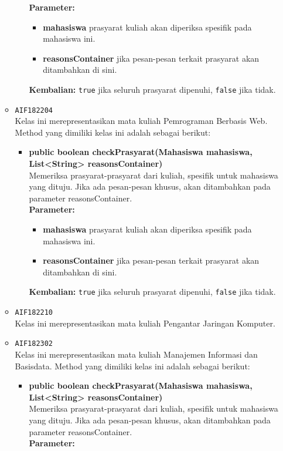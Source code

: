 \begin{enumerate}
\begin{itemize}
\begin{itemize}
\textbf{Parameter:}
\begin{itemize}
\item \textbf{mahasiswa} prasyarat kuliah akan diperiksa spesifik pada mahasiswa ini.
\item \textbf{reasonsContainer} jika pesan-pesan terkait prasyarat akan ditambahkan di sini.
\end{itemize}
\textbf{Kembalian:} \texttt{true} jika seluruh prasyarat dipenuhi, \texttt{false} jika tidak.
\end{itemize}
\item \texttt{AIF182204} \\
Kelas ini merepresentasikan mata kuliah Pemrograman Berbasis Web. Method yang dimiliki kelas ini adalah sebagai berikut: 
\begin{itemize}
\item \textbf{public boolean checkPrasyarat(Mahasiswa mahasiswa, List<String> reasonsContainer)}\\
Memeriksa prasyarat-prasyarat dari kuliah, spesifik untuk mahasiswa yang dituju. Jika ada pesan-pesan khusus, akan ditambahkan pada parameter reasonsContainer.\\
\textbf{Parameter:}
\begin{itemize}
\item \textbf{mahasiswa} prasyarat kuliah akan diperiksa spesifik pada mahasiswa ini.
\item \textbf{reasonsContainer} jika pesan-pesan terkait prasyarat akan ditambahkan di sini.
\end{itemize}
\textbf{Kembalian:} \texttt{true} jika seluruh prasyarat dipenuhi, \texttt{false} jika tidak.
\end{itemize}
\item \texttt{AIF182210} \\
Kelas ini merepresentasikan mata kuliah Pengantar Jaringan Komputer.
\item \texttt{AIF182302} \\
Kelas ini merepresentasikan mata kuliah Manajemen Informasi dan Basisdata. Method yang dimiliki kelas ini adalah sebagai berikut: 
\begin{itemize}
\item \textbf{public boolean checkPrasyarat(Mahasiswa mahasiswa, List<String> reasonsContainer)}\\
Memeriksa prasyarat-prasyarat dari kuliah, spesifik untuk mahasiswa yang dituju. Jika ada pesan-pesan khusus, akan ditambahkan pada parameter reasonsContainer.\\
\textbf{Parameter:}

\end{itemize}
\end{itemize}
\end{enumerate}
